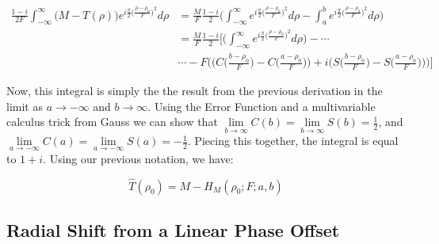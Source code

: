 \documentclass{article}
\theoremstyle{mystyle}
\begin{document}
\begin{align}
\nonumber \frac{1-i}{2F}\int_{-\infty}^{\infty}\big(M-T(\rho)\big)e^{i\frac{\pi}{2}\big(\frac{\rho-\rho_0}{F}\big)^2}d\rho &= \frac{M}{F}\frac{1-i}{2}\Bigg(\int_{-\infty}^{\infty}e^{i\frac{\pi}{2}\big(\frac{\rho-\rho_0}{F}\big)^2}d\rho - \int_{a}^{b}e^{i\frac{\pi}{2}\big(\frac{\rho-\rho_0}{F}\big)^2}d\rho\Bigg)\\
\nonumber &= \frac{M}{F}\frac{1-i}{2}\Bigg[\Bigg(\int_{-\infty}^{\infty}e^{i\frac{\pi}{2}\big(\frac{\rho-\rho_0}{F}\big)^2}d\rho\Bigg) - \cdots \\ \nonumber &\cdots - F\Bigg(\bigg(C\big(\frac{b-\rho_0}{F}\big)-C\big(\frac{a-\rho_0}{F}\big)\bigg)+i\bigg(S\big(\frac{b-\rho_0}{F}\big)-S\big(\frac{a-\rho_0}{F}\big)\bigg)\Bigg)\Bigg]
\end{align}

Now, this integral is simply the the result from the previous derivation in the limit as $a\rightarrow -\infty$ and $b\rightarrow \infty$. Using the Error Function and a multivariable calculus trick from Gauss we can show that $\underset{b \rightarrow \infty}\lim C(b) = \underset{b\rightarrow \infty}\lim S(b) = \frac{1}{2}$, and $\underset{a \rightarrow -\infty}\lim C(a) = \underset{a\rightarrow -\infty}\lim S(a) = -\frac{1}{2}$. Piecing this together, the integral is equal to $1+i$. Using our previous notation, we have:

\begin{equation}
\hat{T}(\rho_0) = M-H_{M}(\rho_0;F;a,b)
\end{equation}

\subsection{Radial Shift from a Linear Phase Offset}
\end{document}
